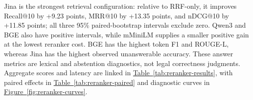 Jina is the strongest retrieval configuration: relative to RRF-only, it
improves Recall@10 by +9.23 points, MRR@10 by +13.35 points, and nDCG@10 by
+11.85 points; all three 95\% paired-bootstrap intervals exclude zero. Qwen3
and BGE also have positive intervals, while mMiniLM supplies a smaller
positive gain at the lowest reranker cost. BGE has the highest token F1 and
ROUGE-L, whereas Jina has the highest observed unanswerable accuracy. These
answer metrics are lexical and abstention diagnostics, not legal correctness
judgments. Aggregate scores and latency are linked in
\hyperref[tab:reranker-results]{Table~\ref*{tab:reranker-results}}, with
paired effects in \hyperref[tab:reranker-paired]{Table~\ref*{tab:reranker-paired}}
and diagnostic curves in \hyperref[fig:reranker-curves]{Figure~\ref*{fig:reranker-curves}}.

\begin{table}[t]
\centering
\scriptsize
\caption{Multi-reranker ablation over a shared 30-candidate pool and final
top-10 context. Retrieval and overlap values are means over 400 answerable
questions; recorded unanswerable accuracy and p50 latency use the complete
500-case runs.}
\label{tab:reranker-results}
\end{table}

